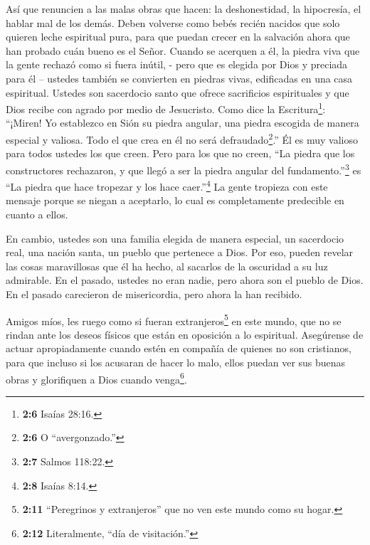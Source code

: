  Así que renuncien a las malas obras que hacen: la
deshonestidad, la hipocresía, el hablar mal de los demás. 
Deben volverse como bebés recién nacidos que solo quieren leche
espiritual pura, para que puedan crecer en la salvación 
ahora que han probado cuán bueno es el Señor.  Cuando se
acerquen a él, la piedra viva que la gente rechazó como si fuera inútil,
- pero que es elegida por Dios y preciada para él -- 
ustedes también se convierten en piedras vivas, edificadas en una casa
espiritual. Ustedes son sacerdocio santo que ofrece sacrificios
espirituales y que Dios recibe con agrado por medio de Jesucristo.
 Como dice la Escritura\footnote{\textbf{2:6} Isaías 28:16.}:
``¡Miren! Yo establezco en Sión su piedra angular, una piedra escogida
de manera especial y valiosa. Todo el que crea en él no será
defraudado\footnote{\textbf{2:6} O ``avergonzado.''}.''  Él
es muy valioso para todos ustedes los que creen. Pero para los que no
creen, ``La piedra que los constructores rechazaron, y que llegó a ser
la piedra angular del fundamento.''\footnote{\textbf{2:7} Salmos 118:22.}
 es ``La piedra que hace tropezar y los hace
caer.''\footnote{\textbf{2:8} Isaías 8:14.} La gente tropieza con este
mensaje porque se niegan a aceptarlo, lo cual es completamente
predecible en cuanto a ellos.

 En cambio, ustedes son una familia elegida de manera
especial, un sacerdocio real, una nación santa, un pueblo que pertenece
a Dios. Por eso, pueden revelar las cosas maravillosas que él ha hecho,
al sacarlos de la oscuridad a su luz admirable.  En el
pasado, ustedes no eran nadie, pero ahora son el pueblo de Dios. En el
pasado carecieron de misericordia, pero ahora la han recibido.

 Amigos míos, les ruego como si fueran
extranjeros\footnote{\textbf{2:11} ``Peregrinos y extranjeros'' que no
  ven este mundo como su hogar.} en este mundo, que no se rindan ante
los deseos físicos que están en oposición a lo espiritual. 
Asegúrense de actuar apropiadamente cuando estén en compañía de quienes
no son cristianos, para que incluso si los acusaran de hacer lo malo,
ellos puedan ver sus buenas obras y glorifiquen a Dios cuando
venga\footnote{\textbf{2:12} Literalmente, ``día de visitación.''}.

